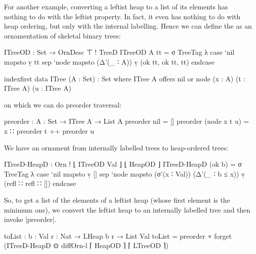 For another example, converting a leftist heap to a list of its elements has nothing to do with the leftist property.
In fact, it even has nothing to do with heap ordering, but only with the internal labelling.
Hence we can define the  as an ornamentation of skeletal binary trees:
\begin{code}
ITreeOD : Set → OrnDesc ⊤ ! TreeD
ITreeOD A tt = σ TreeTag  λ  case  `nil   mapsto  ṿ tt
                             sep   `node  mapsto  (Δ'(_ ∶ A)) ṿ (ok tt, ok tt, tt) endcase

indexfirst data ITree (A : Set) : Set where
  ITree A  offers  nil
           or      node (x : A) (t : ITree A) (u : ITree A)
\end{code}
on which we can do preorder traversal:
\begin{code}
preorder : {A : Set} → ITree A → List A
preorder nil           =  []
preorder (node x t u)  =  x ∷ preorder t ++ preorder u
\end{code}
We have an ornament from internally labelled trees to heap-ordered trees:
\begin{code}
ITreeD-HeapD : Orn ! ⌊ ITreeOD Val ⌋ ⌊ HeapOD ⌋
ITreeD-HeapD (ok b) =
  σ TreeTag λ  case  `nil   mapsto  ṿ []
               sep   `node  mapsto  (σ'(x ∶ Val)) (Δ'(_ ∶ b ≤ x)) ṿ (refl ∷ refl ∷ []) endcase
\end{code}
So, to get a list of the elements of a leftist heap (whose first element is the minimum one), we convert the leftist heap to an internally labelled tree and then invoke |preorder|.
\begin{code}
toList : {b : Val} {r : Nat} → LHeap b r → List Val
toList = preorder ∘ forget (ITreeD-HeapD ⊙ diffOrn-l ⌈ HeapOD ⌉ ⌈ LTreeOD ⌉)
\end{code}

